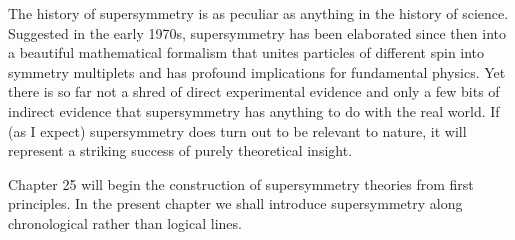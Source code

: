 
The history of supersymmetry is as peculiar as anything in the history of
science. Suggested in the early 1970s, supersymmetry has been elaborated since
then into a beautiful mathematical formalism that unites particles of different
spin into symmetry multiplets and has profound implications for fundamental
physics. Yet there is so far not a shred of direct experimental evidence and
only a few bits of indirect evidence that supersymmetry has anything to do with
the real world. If (as I expect) supersymmetry does turn out to be relevant to
nature, it will represent a striking success of purely theoretical insight.

Chapter 25 will begin the construction of supersymmetry theories from first
principles. In the present chapter we shall introduce supersymmetry along
chronological rather than logical lines.
